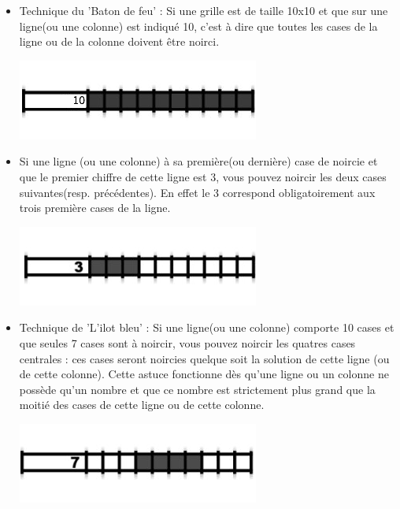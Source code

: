 	\begin{itemize}
		\item Technique du 'Baton de feu' : Si une grille est de taille 10x10 et que sur une ligne(ou une colonne) est indiqué 10, c'est à dire que toutes les cases de la ligne ou de la colonne doivent être noirci.\\

	\begin{center}
		\includegraphics{data/manuels/10par10.png}\\
	\end{center}

		\item Si une ligne (ou une colonne) à sa première(ou dernière) case de noircie et que le premier chiffre de cette ligne est 3, vous pouvez noircir les deux cases suivantes(resp. précédentes). En effet le 3 correspond obligatoirement aux trois première cases de la ligne.\\
	\begin{center}
		\includegraphics{data/manuels/3premier.png}\\
	\end{center}
\newpage
		\item Technique de 'L'ilot bleu' : Si une ligne(ou une colonne) comporte 10 cases et que seules 7 cases sont à noircir, vous pouvez noircir les quatres cases centrales : ces cases seront noircies quelque soit la solution de cette ligne (ou de cette colonne). Cette astuce fonctionne dès qu'une ligne ou un colonne ne possède qu'un nombre et que ce nombre est strictement plus grand que la moitié des cases de cette ligne ou de cette colonne.\\

	\begin{center}
		\includegraphics{data/manuels/7casesSur10.png}
	\end{center}
		

\end{itemize}
